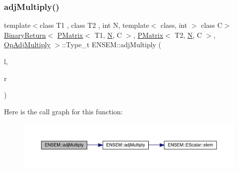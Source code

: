 \subsubsection{\texorpdfstring{adjMultiply()}{adjMultiply()}\hspace{0.1cm}{\footnotesize\ttfamily [3/3]}}
{\footnotesize\ttfamily template$<$class T1 , class T2 , int N, template$<$ class, int $>$ class C$>$ \\
\mbox{\hyperlink{structENSEM_1_1BinaryReturn}{Binary\+Return}}$<$ \mbox{\hyperlink{classENSEM_1_1PMatrix}{P\+Matrix}}$<$ T1, \mbox{\hyperlink{operator__name__util_8cc_a7722c8ecbb62d99aee7ce68b1752f337}{N}}, C $>$, \mbox{\hyperlink{classENSEM_1_1PMatrix}{P\+Matrix}}$<$ T2, \mbox{\hyperlink{operator__name__util_8cc_a7722c8ecbb62d99aee7ce68b1752f337}{N}}, C $>$, \mbox{\hyperlink{structENSEM_1_1OpAdjMultiply}{Op\+Adj\+Multiply}} $>$\+::Type\+\_\+t E\+N\+S\+E\+M\+::adj\+Multiply (\begin{DoxyParamCaption}\item[{const \mbox{\hyperlink{classENSEM_1_1PMatrix}{P\+Matrix}}$<$ T1, \mbox{\hyperlink{operator__name__util_8cc_a7722c8ecbb62d99aee7ce68b1752f337}{N}}, C $>$ \&}]{l,  }\item[{const \mbox{\hyperlink{classENSEM_1_1PMatrix}{P\+Matrix}}$<$ T2, \mbox{\hyperlink{operator__name__util_8cc_a7722c8ecbb62d99aee7ce68b1752f337}{N}}, C $>$ \&}]{r }\end{DoxyParamCaption})\hspace{0.3cm}{\ttfamily [inline]}}

Here is the call graph for this function\+:\nopagebreak
\begin{figure}[H]
\begin{center}
\leavevmode
\includegraphics[width=350pt]{df/d0a/group__primmatrix_gac28cbe7440b96e5650ac2c201b8c5ac2_cgraph}
\end{center}
\end{figure}
\mbox{\label{group__primmatrix_gada4da32758440b83d445ae4a0e14297e}} 
